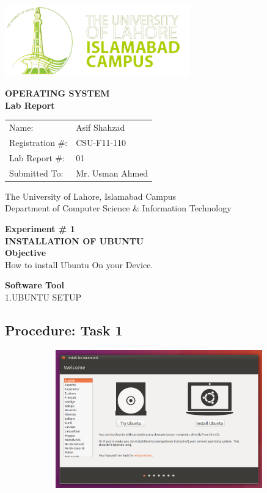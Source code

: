 \documentclass[11pt]{article}            %
\begin{document}
\begin{titlepage}
    \centering
  \vfill
    \includegraphics[width=8cm]{uni_logo.png} \\ 
	\vskip2cm
    {\bfseries\Large
	OPERATING SYSTEM\\
	
	\vskip2cm
	Lab Report 
	 
	\vskip2cm
	}    

\begin{center}
\begin{tabular}{ l l  } 

Name: & Asif Shahzad \\ 
Registration \#: & CSU-F11-110 \\ 
Lab Report \#: & 01 \\ 
Submitted To:& Mr. Usman Ahmed\\ 

\end{tabular}
\end{center}
    \vfill
    The University of Lahore, Islamabad Campus\\
Department of Computer Science \& Information Technology
\end{titlepage}

 



   
    {\bfseries\Large
\centering
	Experiment \# 1 \\

INSTALLATION OF UBUNTU\\
	
	}    
 \vskip1cm
 \textbf {Objective}\\  How to install Ubuntu On your Device.
 
 \textbf {Software Tool} \\
1.UBUNTU SETUP  \\






\subsection{Procedure: Task 1}     
\centering
  \includegraphics[width=24cm,height=6cm,keepaspectratio]{seven.png}
\end{document}
